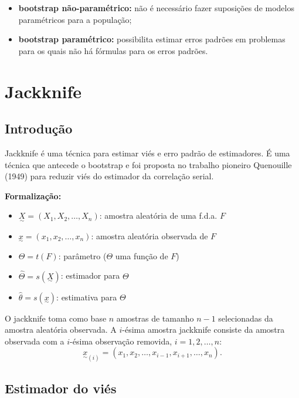 \documentclass[
  letterpaper,
  DIV=11,
  numbers=noendperiod]{scrreprt}
\providecommand{\tightlist}{%
  \setlength{\itemsep}{0pt}\setlength{\parskip}{0pt}}\usepackage{longtable,booktabs,array}
\begin{document}
\begin{itemize}
\tightlist
\item
  \textbf{bootstrap não-paramétrico:} não é necessário fazer suposições
  de modelos paramétricos para a população;
\item
  \textbf{bootstrap paramétrico:} possibilita estimar erros padrões em
  problemas para os quais não há fórmulas para os erros padrões.
\end{itemize}

\section{Jackknife}\label{jackknife}

\subsection{Introdução}\label{introduuxe7uxe3o-3}

Jackknife é uma técnica para estimar viés e erro padrão de estimadores.
É uma técnica que antecede o bootstrap e foi proposta no trabalho
pioneiro Quenouille (1949) para reduzir viés do estimador da correlação
serial.

\textbf{Formalização:}

\begin{itemize}
\item
  \(\underset{\sim}{X} = (X_1, X_2, \dots, X_n)\): amostra aleatória de
  uma f.d.a. \(F\)
\item
  \(\underset{\sim}{x} = (x_1, x_2, \dots, x_n)\): amostra aleatória
  observada de \(F\)
\item
  \(\Theta=t(F)\): parâmetro (\(\Theta\) uma função de \(F\))
\item
  \(\hat{\Theta}=s(\underset{\sim}{X})\): estimador para \(\Theta\)
\item
  \(\hat{\theta}=s(\underset{\sim}{x})\): estimativa para \(\Theta\)
\end{itemize}

O jackknife toma como base \(n\) amostras de tamanho \(n-1\)
selecionadas da amostra aleatória observada. A \(i\)-ésima amostra
jackknife consiste da amostra observada com a \(i\)-ésima observação
removida, \(i=1,2, \ldots, n\):
\[{\underset{\sim}{x}}_{(i)}=(x_1,x_2,\ldots, x_{i-1},x_{i+1}, \ldots, x_n).\]

\subsection{Estimador do viés}\label{estimador-do-viuxe9s}
\end{document}
